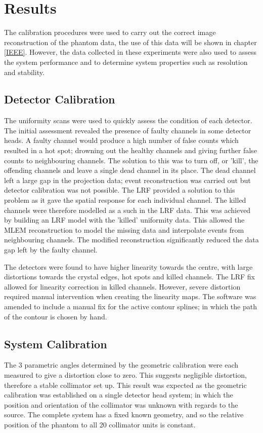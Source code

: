 \section{Results}
The calibration procedures were used to carry out the correct image reconstruction of the phantom data, the use of this data will be shown in chapter \ref{IEEE}. However, the data collected in these experiments were also used to assess the system performance and to determine system properties such as resolution and stability. 

\subsection{Detector Calibration}
 The uniformity scans were used to quickly assess the condition of each detector. The initial assessment revealed the presence of faulty channels in some detector heads. A faulty channel would produce a high number of false counts which resulted in a hot spot; drowning out the healthy channels and giving further false counts to neighbouring channels. The solution to this was to turn off, or 'kill', the offending channels and leave a single dead channel in its place. The dead channel left a large gap in the projection data; event reconstruction was carried out but detector calibration was not possible. The \acrshort{LRF} provided a solution to this problem as it gave the spatial response for each individual channel. The killed channels were therefore modelled as a such in the \acrshort{LRF} data. This was achieved by building an \acrshort{LRF} model with the 'killed' uniformity data. This allowed the \acrshort{MLEM} reconstruction to model the missing data and interpolate events from neighbouring channels. The modified reconstruction significantly reduced the data gap left by the faulty channel.
 
 The detectors were found to have higher linearity towards the centre, with large distortions towards the crystal edges, hot spots and killed channels. The \acrshort{LRF} fix allowed for linearity correction in killed channels. However, severe distortion required manual intervention when creating the linearity maps. The software was amended to include a manual fix for the active contour splines; in which the path of the contour is chosen by hand. 

\subsection{System Calibration}
The 3 parametric angles determined by the geometric calibration were each measured to give a distortion close to zero. This suggests negligible distortion, therefore a stable collimator set up. This result was expected as the geometric calibration was established on a single detector head system; in which the position and orientation of the collimator was unknown with regards to the source. The complete system has a fixed known geometry, and so the relative position of the phantom to all 20 collimator units is constant. 

